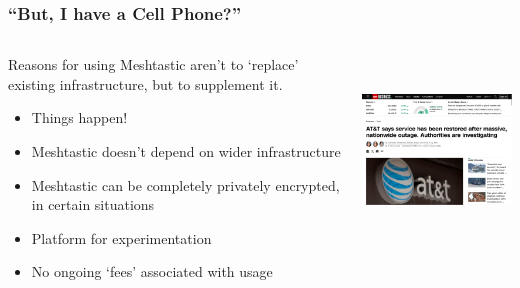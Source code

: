 \documentclass[aspectratio=169]{beamer}
\begin{document}
\begin{frame}[fragile]
  \frametitle{``But, I have a Cell Phone?''}
  \begin{columns}[]
    \begin{column}[T]{0.45\paperwidth}
      Reasons for using Meshtastic aren't to `replace' existing infrastructure, but to supplement it.
      \begin{itemize}%
        \item{Things happen!}
        \item{Meshtastic doesn't depend on wider infrastructure}
        \item{Meshtastic can be completely privately encrypted, in certain situations}
        \item{Platform for experimentation}
        \item{No ongoing `fees' associated with usage}
     \end{itemize}
    \end{column}
    \begin{column}[T]{0.45\paperwidth}
      \includegraphics[height=5cm,keepaspectratio]{images/att.png}
    \end{column}
  \end{columns}
\end{frame}

\end{document}

